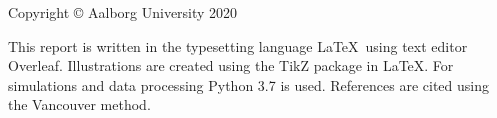 \thispagestyle{empty}
{\small
\strut\vfill %
\noindent Copyright \copyright{} Aalborg University 2020\par
\vspace{0.2cm}
\noindent This report is written in the typesetting language \LaTeX \, using text editor Overleaf. Illustrations are created using the TikZ package in \LaTeX. For simulations and data processing Python 3.7 is used. References are cited using the Vancouver method.}
\clearpage